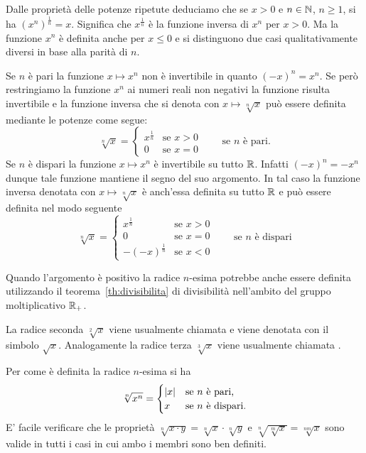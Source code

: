 Dalle proprietà delle potenze ripetute deduciamo che se $x>0$
e $n\in\mathbb N$, $n\ge 1$, si ha $(x^n)^\frac 1 n = x$.
Significa che $x^{\frac 1 n}$ è la funzione inversa di $x^n$ per $x>0$.
Ma la funzione $x^n$ è definita anche per $x\le 0$ e si distinguono due 
casi qualitativamente diversi in base alla parità di $n$.

Se $n$ è pari la funzione $x\mapsto x^n$ non è invertibile in quanto 
$(-x)^n = x^n$. 
Se però restringiamo la funzione $x^n$ ai numeri reali non negativi
la funzione risulta invertibile e la funzione inversa 
che si denota con $x\mapsto\sqrt[n]{x}$ 
può essere definita mediante le potenze come segue:
\[
   \sqrt[n]{x} = \begin{cases}
      x^{\frac 1 n} & \text{se $x>0$}\\
      0 & \text{se $x=0$}
   \end{cases} \qquad \text{se $n$ è pari}.
\]
Se $n$ è dispari la funzione $x\mapsto x^n$ è invertibile su tutto 
$\mathbb R$. 
Infatti $(-x)^n = -x^n$ dunque tale funzione mantiene il segno 
del suo argomento. In tal caso la funzione inversa 
denotata con $x\mapsto \sqrt[n]{x}$
è anch'essa definita su tutto $\mathbb R$ e può essere definita 
nel modo seguente
\[
   \sqrt[n]{x} = \begin{cases}
      x^{\frac 1 n} & \text{se $x>0$} \\ 
      0 & \text{se $x=0$}\\
      -(-x)^{\frac 1 n} & \text{se $x<0$}
   \end{cases}
   \qquad\text{se $n$ è dispari}
\]

Quando l'argomento è positivo la radice $n$-esima 
potrebbe anche essere definita utilizzando il teorema~\ref{th:divisibilita}
di divisibilità nell'ambito del gruppo moltiplicativo $\mathbb R_+$.

La radice seconda $\sqrt[2]{x}$ viene usualmente chiamata 
 e
viene denotata con il simbolo $\sqrt{x}$.
Analogamente la radice terza $\sqrt[3]{x}$ viene usualmente chiamata 
.

Per come è definita la radice $n$-esima si ha 
\[
  \sqrt[n]{x^n} = 
  \begin{cases}
     {\left|x\right|} & \text{se $n$ è pari,} \\
     x & \text{se $n$ è dispari.}
  \end{cases}
\]
E' facile verificare che le proprietà 
$\sqrt[n]{x\cdot y} = \sqrt[n]{x} \cdot \sqrt[n]{y}$
e $\sqrt[n]{\sqrt[m]{x}} = \sqrt[nm]{x}$
sono valide in tutti i casi in cui ambo i membri sono ben definiti. 

